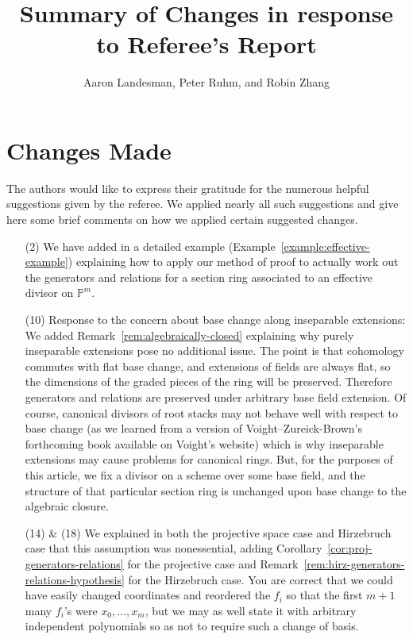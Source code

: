\documentclass[10 pt]{amsart}
\title{Summary of Changes in response to Referee's Report}
\author{Aaron Landesman, Peter Ruhm, and Robin Zhang}
\theoremstyle{plain}
\theoremstyle{definition}
\theoremstyle{remark}
\numberwithin{equation}{section}
\newcommand\bp{{\mathbb P}}
\begin{document}
\maketitle
\section{Changes Made}
The authors would like to express their gratitude for
the numerous helpful suggestions given by the referee.
We applied nearly all such suggestions and give here
some brief comments on how we applied certain suggested
changes.
\begin{enumerate}
	\item[(2)] 
		We have added in a detailed example 
		(Example~\autoref{example:effective-example})
		explaining how to apply our method of proof to actually work out
		the generators and relations for a section ring
		associated to an effective divisor on $\bp^m$.

	\item[(10)]
		Response to the concern about base change along inseparable
		extensions:
		We added Remark~\autoref{rem:algebraically-closed}
		explaining why purely inseparable extensions pose
		no additional issue. The point is that cohomology commutes with
		flat base change, and extensions of fields
		are always flat, so the dimensions of the graded pieces of the
		ring will be preserved. Therefore generators
		and relations are preserved under arbitrary base field
		extension. Of course, canonical divisors of root stacks may not
		behave well with respect to base change (as we learned from a
		version of Voight--Zureick-Brown's forthcoming book available
		on Voight's website)
		which is why inseparable extensions
		may cause problems for canonical rings.
		But, for the purposes of this article, we fix a divisor on a
		scheme over some base field, and the structure of that particular section
		ring is unchanged upon base change to the algebraic closure.

	\item[(14) \& (18)]
		We explained in both the projective space case and Hirzebruch case
		that this assumption was nonessential, adding
		Corollary~\autoref{cor:proj-generators-relations} for the projective case
		and Remark~\autoref{rem:hirz-generators-relations-hypothesis} for the
		Hirzebruch case. You are correct that we could have easily changed
		coordinates and reordered the $f_i$ so that the first $m+1$
		many $f_i$'s were $x_0, \ldots, x_m$, but
		we may as well state it with arbitrary independent polynomials so
		as not to require such a change of basis.
		

\end{enumerate}
\end{document}
